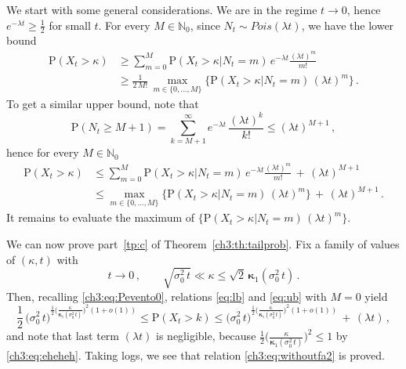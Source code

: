 \documentclass[a4paper,reqno,11pt]{amsart}
\numberwithin{equation}{section}
\newcommand{\N}{\mathbb{N}}
\newcommand{\PEfont}{\mathrm}
\renewcommand{\P}{\ensuremath{\PEfont P}}
\newcommand\bkappa{\boldsymbol{\kappa}}
\begin{document}
We start with some general considerations.
We are in the regime $t\to 0$, hence $e^{-\lambda t} \ge \frac{1}{2}$ for small $t$.
For every $M \in\N_0$, since $N_t \sim Pois(\lambda t)$, we have the lower bound
\begin{equation}\label{eq:lb}
\begin{split}
	\P(X_t>\kappa) & \ge \sum_{m=0}^{M}\P(X_t>\kappa| N_t=m) \,
	e^{-\lambda t} \frac{(\lambda t)^m}{m!}	\\
	& \ge \frac{1}{2 \, M!} \, \max_{m \in \{0,\ldots, M\}} 
	\Big\{ \P(X_t>\kappa| N_t=m) \, (\lambda t)^m \Big\} \,.
\end{split}
\end{equation}
To get a similar upper bound, note that
\begin{equation*}
	\P(N_t \ge M+1) = \sum_{k=M+1}^\infty e^{-\lambda t} \, \frac{(\lambda t)^k}{k!}
	\le (\lambda t)^{M+1} \,,
\end{equation*}
hence for every $M\in\N_0$
\begin{equation}\label{eq:ub}
\begin{split}
	\P(X_t>\kappa) & \le \sum_{m=0}^{M}\P(X_t>\kappa| N_t=m) \,
	e^{-\lambda t} \frac{(\lambda t)^m}{m!} \,+\, (\lambda t)^{M+1}\\
	& \le \max_{m \in \{0,\ldots, M\}} 
	\Big\{ \P(X_t>\kappa| N_t=m) \, (\lambda t)^m \Big\} \,+\, (\lambda t)^{M+1}\,.
\end{split}
\end{equation}
It remains to evaluate the maximum of $\{\P(X_t>\kappa| N_t=m) \, (\lambda t)^m\}$.

We can now prove part~\eqref{tp:c} of Theorem~\ref{ch3:th:tailprob}.
Fix a family of values of $(\kappa,t)$ with
\begin{equation}\label{ch3:eq:eheheh}
	t \to 0 \,, \qquad
	\sqrt{ \sigma_0^2 \, t} \ll \kappa \le \sqrt{2} \, \bkappa_1( \sigma_0^2 \, t) \,.
\end{equation}
Then, recalling \eqref{ch3:eq:Pevento0}, relations \eqref{eq:lb} and \eqref{eq:ub}
with $M=0$ yield
\begin{equation*}
	\frac{1}{2} \, \big( \sigma_0^2 \, t \big)^{ \frac{1}{2} \big(\frac{\kappa}
	{\bkappa_1(\sigma_0^2\, t)} \big)^2(1+o(1)) }
	\le \P(X_t > k) \le \big( \sigma_0^2 \, t \big)^{ \frac{1}{2} \big(\frac{\kappa}
	{\bkappa_1(\sigma_0^2\, t)} \big)^2(1+o(1)) }
	\,+\, (\lambda t) \,,
\end{equation*}
and note that last term $(\lambda t)$ is negligible, because
$\frac{1}{2} \big(\frac{\kappa}{\bkappa_1(\sigma_0^2\, t)} \big)^2 \le 1$
by \eqref{ch3:eq:eheheh}. Taking logs, we see that relation \eqref{ch3:eq:withoutfa2} is proved.
\end{document}
